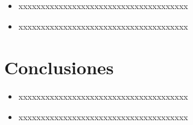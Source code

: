\documentclass[%
 reprint,
 amsmath,amssymb,
 aps,
]{revtex4-1}
\begin{document}
\begin{itemize}
\item xxxxxxxxxxxxxxxxxxxxxxxxxxxxxxxxxxxxxx 
\item xxxxxxxxxxxxxxxxxxxxxxxxxxxxxxxxxxxxxx 
\end{itemize}
\section{Conclusiones}

\begin{itemize}
\item xxxxxxxxxxxxxxxxxxxxxxxxxxxxxxxxxxxxxx 
\item xxxxxxxxxxxxxxxxxxxxxxxxxxxxxxxxxxxxxx 

\end{itemize}






\end{document}
